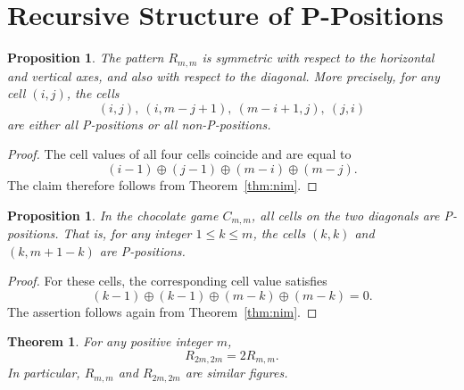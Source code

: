 \documentclass{article}
\theoremstyle{definition}
\theoremstyle{plain}
\newtheorem{theorem}[definition]{Theorem}
\newtheorem{proposition}[definition]{Proposition}
\theoremstyle{remark}
\begin{document}
\section{Recursive Structure of P-Positions}

\begin{proposition}
\label{prop:symmetry}
The pattern $R_{m,m}$ is symmetric with respect to the horizontal and vertical
axes, and also with respect to the diagonal.
More precisely, for any cell $(i,j)$, the cells
\[
(i,j),\ (i,m-j+1),\ (m-i+1,j),\ (j,i)
\]
are either all P-positions or all non-P-positions.
\end{proposition}

\begin{proof}
The cell values of all four cells coincide and are equal to
\[
(i-1)\oplus(j-1)\oplus(m-i)\oplus(m-j).
\]
The claim therefore follows from Theorem~\ref{thm:nim}.
\end{proof}

\begin{proposition}
\label{prop:diagonal}
In the chocolate game $C_{m,m}$, all cells on the two diagonals are P-positions.
That is, for any integer $1\le k\le m$, the cells $(k,k)$ and $(k,m+1-k)$ are
P-positions.
\end{proposition}

\begin{proof}
For these cells, the corresponding cell value satisfies
\[
(k-1)\oplus(k-1)\oplus(m-k)\oplus(m-k)=0.
\]
The assertion follows again from Theorem~\ref{thm:nim}.
\end{proof}

\begin{theorem}
\label{thm:doubling}
For any positive integer $m$,
\[
R_{2m,2m}=2R_{m,m}.
\]
In particular, $R_{m,m}$ and $R_{2m,2m}$ are similar figures.
\end{theorem}
\end{document}
